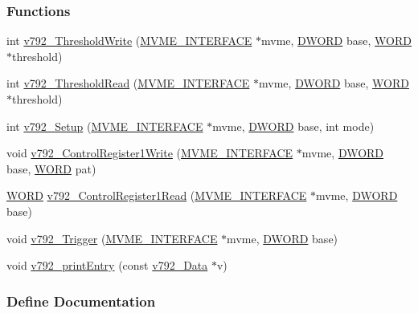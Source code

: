 \subsubsection*{Functions}
\begin{DoxyCompactItemize}
\item 
int \hyperlink{v792_8h_a3eec625d3dca654c6f99f82d964d4287}{v792\_\-ThresholdWrite} (\hyperlink{structMVME__INTERFACE}{MVME\_\-INTERFACE} $\ast$mvme, \hyperlink{vt2_8h_a798af1e30bc65f319c1a246cecf59e39}{DWORD} base, \hyperlink{vt2_8h_a2b0e863dadf920709ec53d9088ee7c91}{WORD} $\ast$threshold)
\item 
int \hyperlink{v792_8h_a6410a5e010a043f3c1f0ccac13e89ec4}{v792\_\-ThresholdRead} (\hyperlink{structMVME__INTERFACE}{MVME\_\-INTERFACE} $\ast$mvme, \hyperlink{vt2_8h_a798af1e30bc65f319c1a246cecf59e39}{DWORD} base, \hyperlink{vt2_8h_a2b0e863dadf920709ec53d9088ee7c91}{WORD} $\ast$threshold)
\item 
int \hyperlink{v792_8h_ab1fa02b31b58838414803d8d750dbaa3}{v792\_\-Setup} (\hyperlink{structMVME__INTERFACE}{MVME\_\-INTERFACE} $\ast$mvme, \hyperlink{vt2_8h_a798af1e30bc65f319c1a246cecf59e39}{DWORD} base, int mode)
\item 
void \hyperlink{v792_8h_ac3b568047c03f5b511378cd608eb11fd}{v792\_\-ControlRegister1Write} (\hyperlink{structMVME__INTERFACE}{MVME\_\-INTERFACE} $\ast$mvme, \hyperlink{vt2_8h_a798af1e30bc65f319c1a246cecf59e39}{DWORD} base, \hyperlink{vt2_8h_a2b0e863dadf920709ec53d9088ee7c91}{WORD} pat)
\item 
\hyperlink{vt2_8h_a2b0e863dadf920709ec53d9088ee7c91}{WORD} \hyperlink{v792_8h_ab4e2ce6a3f923e95a23d9e6990265b8d}{v792\_\-ControlRegister1Read} (\hyperlink{structMVME__INTERFACE}{MVME\_\-INTERFACE} $\ast$mvme, \hyperlink{vt2_8h_a798af1e30bc65f319c1a246cecf59e39}{DWORD} base)
\item 
void \hyperlink{v792_8h_a14c74a32db3fd4dacdeadfdfdefaff26}{v792\_\-Trigger} (\hyperlink{structMVME__INTERFACE}{MVME\_\-INTERFACE} $\ast$mvme, \hyperlink{vt2_8h_a798af1e30bc65f319c1a246cecf59e39}{DWORD} base)
\item 
void \hyperlink{v792_8h_a24de5c4823e19a5361b4fd5fe4f1f087}{v792\_\-printEntry} (const \hyperlink{unionv792__Data}{v792\_\-Data} $\ast$v)
\end{DoxyCompactItemize}


\subsubsection{Define Documentation}
